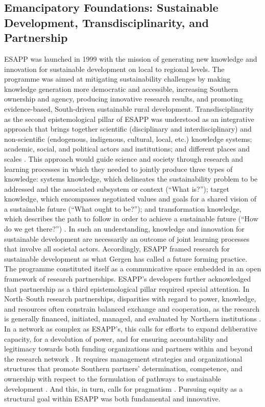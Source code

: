 \documentclass[10pt,a4paper]{article}
\begin{document}
\begin{multicols}{2}
\subsection{Emancipatory Foundations: Sustainable Development, Transdisciplinarity, and Partnership}
\noindent ESAPP was launched in 1999 with the mission of generating new knowledge and innovation for sustainable development on local to regional levels. The programme was aimed at mitigating sustainability challenges by making knowledge generation more democratic and accessible, increasing Southern ownership and agency, producing innovative research results, and promoting evidence-based, South-driven sustainable rural development. Transdisciplinarity as the second epistemological pillar of ESAPP was understood as an integrative approach that brings together scientific (disciplinary and interdisciplinary) and non-scientific (endogenous, indigenous, cultural, local, etc.) knowledge systems; academic, social, and political actors and institutions; and different places and scales \citep{r50, r52}. This approach would guide science and society through research and learning processes in which they needed to jointly produce three types of knowledge: systems knowledge, which delineates the sustainability problem to be addressed and the associated subsystem or context (``What is?''); target knowledge, which encompasses negotiated values and goals for a shared vision of a sustainable future (``What ought to be?''); and transformation knowledge, which describes the path to follow in order to achieve a sustainable future (``How do we get there?'') \citep{r39, r53, r61}. In such an understanding, knowledge and innovation for sustainable development are necessarily an outcome of joint learning processes that involve all societal actors. Accordingly, ESAPP framed research for sustainable development as what Gergen \citep{r05} has called a future forming practice. The programme constituted itself as a communicative space \citep{r55, r62} embedded in an open framework of research partnerships. ESAPP's developers further acknowledged that partnership as a third epistemological pillar required special attention. In North–South research partnerships, disparities with regard to power, knowledge, and resources often constrain balanced exchange and cooperation, as the research is generally financed, initiated, managed, and evaluated by Northern institutions \citep{r67}. In a network as complex as ESAPP's, this calls for efforts to expand deliberative capacity, for a devolution of power, and for ensuring accountability and legitimacy towards both funding organizations and partners within and beyond the research network \citep{r08, r39}. It requires management strategies and organizational structures that promote Southern partners' determination, competence, and ownership with respect to the formulation of pathways to sustainable development \citep{r44, r57}. And this, in turn, calls for pragmatism \citep{r03, r63}. Pursuing equity as a structural goal within ESAPP was both fundamental and innovative.


\end{multicols}
\end{document}
